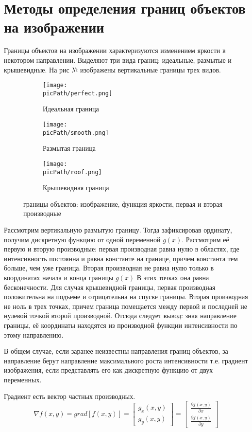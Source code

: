 \documentclass[oneside,final,14pt]{extreport}
\newcommand{\picPath}{pictures}
\begin{document}
\chapter{Методы определения границ объектов на изображении}
Границы объектов на изображении характеризуются изменением яркости в некотором направлении. Выделяют три вида границ: идеальные,  размытые  и крышевидные. На рис № изображены вертикальные границы трех видов.

\begin{figure}[H]
  \centering
  \begin{subfigure}[b]{0.4\linewidth}
    \texttt{[image: \\picPath/perfect.png]}
    \caption{ Идеальная граница}
  \end{subfigure}
  \begin{subfigure}[b]{0.4\linewidth}
    \texttt{[image: \\picPath/smooth.png]}
    \caption{Размытая граница}
  \end{subfigure}
  \begin{subfigure}[b]{0.4\linewidth}
    \texttt{[image: \\picPath/roof.png]}
    \caption{Крышевидная граница}
  \end{subfigure}
  \caption{границы объектов: изображение, функция яркости, первая и вторая производные}
  \label{fig:coffee}
\end{figure}

Рассмотрим вертикальную размытую границу. Тогда зафиксировав ординату, получим дискретную функцию от одной переменной $g(x)$. Рассмотрим её первую и вторую производные: первая производная равна нулю в областях, где интенсивность постоянна и равна константе на границе, причем константа тем больше, чем уже граница. Вторая производная не равна нулю только в координатах начала и конца границы $g(x)$ В этих точках она равна бесконечности. Для случая крышевидной границы, первая производная положительна на подъеме и отрицательна на спуске границы. Вторая производная не ноль в трех точках, причем граница помещается между первой и последней не нулевой точкой второй производной. Отсюда следует вывод: зная направление границы, её координаты находятся из производной функции интенсивности по этому направлению. 
 
В общем случае, если заранее неизвестны направления границ объектов, за направление берут направление максимального роста интенсивности  т.е. градиент изображения, если представлять его как дискретную функцию от двух переменных. 

Градиент есть вектор частных производных.
\begin{equation}
\nabla f(x,y) 
= 
grad[f(x,y)]
=
\begin{bmatrix}
g_x(x,y)\\
g_y(x,y)
\end{bmatrix}
=
\begin{bmatrix}
\frac{\partial f(x,y)}
{\partial x}\\
\frac{\partial f(x,y)}
{\partial y}
\end{bmatrix}
\end{equation}
\end{document}
